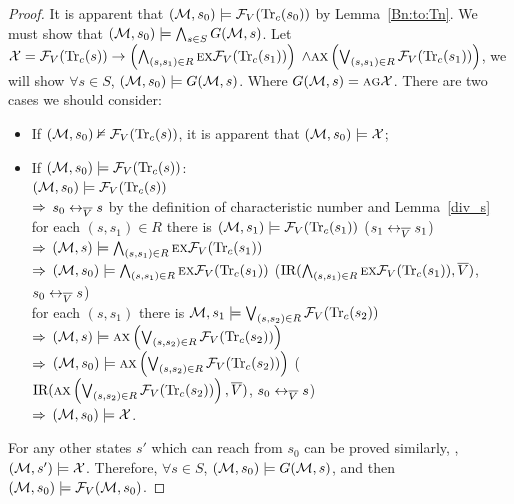 \documentclass{article}
\begin{document}
\begin{proof}
It is apparent that $({\cal M}, s_0) \models {\cal F}_V(\textrm{Tr}_c(s_0))$ by Lemma~\ref{Bn:to:Tn}.
We must show that $({\cal M}, s_0) \models \bigwedge_{s\in S} G({\cal M}, s)$.
Let ${\cal X} = {\cal F}_V(\textrm{Tr}_c(s)) \rightarrow \left(\bigwedge_{(s,s_1) \in R} \textsc{e} \textsc{x} {\cal F}_V(\textrm{Tr}_c(s_1))\right)$ $\wedge \textsc{a} \textsc{x} \left(\bigvee_{(s,s_1) \in R} {\cal F}_V(\textrm{Tr}_c(s_1))\right)$, we will show $\forall s\in S$, $({\cal M}, s_0) \models G({\cal M}, s)$. Where $G({\cal M}, s)=\textsc{a}\textsc{g} \cal X$.
There are two cases we should consider:
\begin{itemize}
  \item  If $({\cal M}, s_0) \nvDash {\cal F}_V(\textrm{Tr}_c(s))$, it is apparent that $({\cal M}, s_0) \models {\cal X}$;
  \item  If $({\cal M}, s_0) \models {\cal F}_V(\textrm{Tr}_c(s))$:\\
         $({\cal M}, s_0) \models {\cal F}_V(\textrm{Tr}_c(s))$\\
        $\Rightarrow$  $s_0 \leftrightarrow_{\overline V} s$ by the definition of characteristic number and Lemma~\ref{div_s}\\
        for each $(s, s_1)\in R$ there is $({\cal M}, s_1) \models {\cal F}_V(\textrm{Tr}_c(s_1))$  \hfill  ($s_1 \leftrightarrow_{\overline V} s_1$)\\
        $\Rightarrow$ $({\cal M}, s) \models \bigwedge_{(s,s_1)\in R}\textsc{e} \textsc{x} {\cal F}_V(\textrm{Tr}_c(s_1))$\\
        $\Rightarrow$ $({\cal M}, s_0) \models \bigwedge_{(s,s_1)\in R}\textsc{e} \textsc{x} {\cal F}_V(\textrm{Tr}_c(s_1))$     \hfill   ($\textrm{IR}(\bigwedge_{(s,s_1)\in R}\textsc{e} \textsc{x} {\cal F}_V(\textrm{Tr}_c(s_1)), \overline V)$, $s_0 \leftrightarrow_{\overline V} s$)\\
         for each $(s, s_1)$ there is ${\cal M}, s_1 \models \bigvee_{(s, s_2)\in R}{\cal F}_V(\textrm{Tr}_c(s_2))$\\
        $\Rightarrow$ $({\cal M}, s) \models \textsc{a} \textsc{x} \left( \bigvee_{(s, s_2)\in R} {\cal F}_V(\textrm{Tr}_c(s_2)) \right)$ \\
        $\Rightarrow$ $({\cal M}, s_0) \models  \textsc{a} \textsc{x} \left( \bigvee_{(s, s_2)\in R} {\cal F}_V(\textrm{Tr}_c(s_2)) \right)$   \hfill  ($\textrm{IR}(\textsc{a} \textsc{x} \left( \bigvee_{(s, s_2)\in R} {\cal F}_V(\textrm{Tr}_c(s_2)) \right), \overline V)$, $s_0 \leftrightarrow_{\overline V} s$)\\
        $\Rightarrow$ $({\cal M}, s_0) \models {\cal X}$.\\
\end{itemize}
For any other states $s'$ which can reach from $s_0$ can be proved similarly, \ie, $({\cal M},s')\models \cal X$.
Therefore, $\forall s\in S$, $({\cal M}, s_0) \models G({\cal M}, s)$, and then $({\cal M}, s_0) \models {\cal F}_V({\cal M}, s_0)$.



\end{proof}
\end{document}
